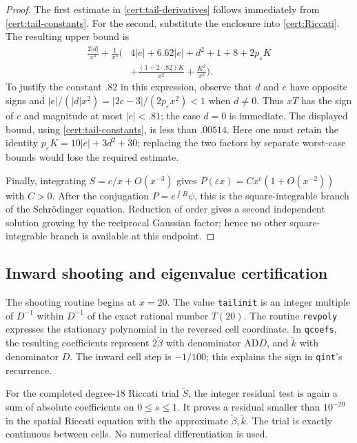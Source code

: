 \documentclass[11pt,a4paper]{article}
\numberwithin{equation}{section}
\theoremstyle{definition}
\theoremstyle{remark}
\begin{document}
\begin{proof}
The first estimate in \eqref{cert:tail-derivatives} follows immediately from
\eqref{cert:tail-constants}.  For the second, substitute the enclosure into
\eqref{cert:Riccati}.  The resulting upper bound is
\begin{align*}
 \frac{2|d|}{x^3}+\frac1{x^5}\bigg(&4|e|+6.62|e|+d^2+1+8
       +2p_\varepsilon K\\
       &+\frac{(1+2\cdot.82)K}{x^2}+\frac{K^2}{x^8}\bigg).
\end{align*}
To justify the constant $.82$ in this expression, observe that $d$ and $e$
have opposite signs and $|e|/(|d|x^2)=|2c-3|/(2p_\varepsilon x^2)<1$
when $d\ne0$.  Thus $xT$ has the sign of $c$ and magnitude at most
$|c|<.81$; the case $d=0$ is immediate.
The displayed bound, using \eqref{cert:tail-constants}, is less than $.00514$.
Here one must retain the identity
$p_\varepsilon K=10|e|+3d^2+30$; replacing the two factors by separate
worst-case bounds would lose the required estimate.

Finally, integrating $S=c/x+O(x^{-3})$ gives
$P(\varepsilon x)=C x^c(1+O(x^{-2}))$ with $C>0$.
After the conjugation $P=e^{\int B}\psi$, this is the square-integrable
branch of the Schr\"odinger equation.  Reduction of order gives a second
independent solution growing by the reciprocal Gaussian factor; hence no
other square-integrable branch is available at this endpoint.
\end{proof}

\subsection{Inward shooting and eigenvalue certification}\label{cert:shooting}

The shooting routine begins at $x=20$.  The value \texttt{tailinit} is an
integer multiple of $D^{-1}$ within $D^{-1}$ of the exact rational number
$T(20)$.  The routine \texttt{revpoly} expresses the stationary polynomial in
the reversed cell coordinate.  In \texttt{qcoefs}, the resulting coefficients
represent $2\widetilde\beta$ with denominator $\mathrm{AD}D$, and
$\widetilde k$ with denominator $D$.  The inward cell step is $-1/100$;
this explains the sign in \texttt{qint}'s recurrence.

For the completed degree-$18$ Riccati trial $\widetilde S$, the integer
residual test is again a sum of absolute coefficients on $0\le s\le1$.
It proves a residual smaller than $10^{-20}$ in the spatial Riccati equation
with the approximate $\widetilde\beta,\widetilde k$.  The trial is exactly
continuous between cells.  No numerical differentiation is used.
\end{document}
